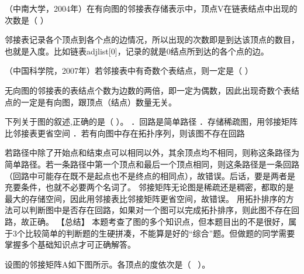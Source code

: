 \question （中南大学，2004年）在有向图的邻接表存储表示中，顶点V在链表结点中出现的次数是（
）
\par{}
\begin{solution}邻接表记录各个顶点到各个点的边情况，所以出现的次数即是到达该顶点的数目，也就是入度。比如链表adjlist{[}0{]}，记录的就是0结点所到达的各个点的边。
\end{solution}
\question （中国科学院，2007年）若邻接表中有奇数个表结点，则一定是（ ）
\par{}
\begin{solution}无向图的邻接表的表结点个数为边数的两倍，即一定为偶数，因此出现奇数个表结点的一定是有向图，跟顶点（结点）数量无关。
\end{solution}
\question 下列关于图的叙述,正确的是（ ）。 ．回路是简单路径
．存储稀疏图，用邻接矩阵比邻接表更省空间
．若有向图中存在拓扑序列，则该图不存在回路
\par{}
\begin{solution}若路径中除了开始点和结束点可以相同以外，其余顶点均不相同，则称这条路径为简单路径。若一条路径中第一个顶点和最后一个顶点相同，则这条路径是一条回路（回路中可能存在既不是起点也不是终点的相同点），故错误。后话，要是两者是充要条件，也就不必要两个名词了。
邻接矩阵无论图是稀疏还是稠密，都取的是最大的存储空间，因此用邻接表比邻接矩阵更省空间，故错误。
用拓扑排序的方法可以判断图中是否存在回路，如果对一个图可以完成拓扑排序，则此图不存在回路，故正确。
【总结】
本题考查了图的多个知识点，但本题目出的不是很好，属于3个比较简单的判断题的生硬拼凑，不能算是好的``综合''题。但做题的同学需要掌握多个基础知识点才可正确解答。
\end{solution}
\question 设图的邻接矩阵A如下图所示。各顶点的度依次是（ ~）。~

